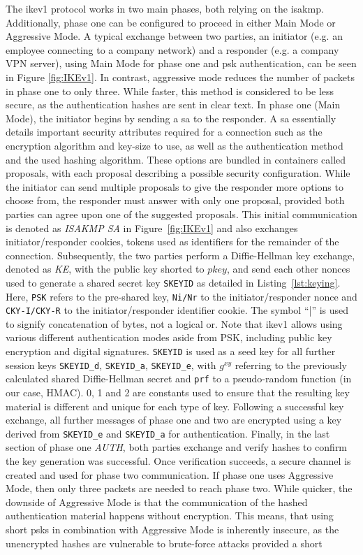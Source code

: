 The \ac{ike}v1 protocol works in two main phases, both relying on the \ac{isakmp}. Additionally, phase one can be configured to proceed in either Main Mode or Aggressive Mode. A typical exchange between two parties, an initiator (e.g. an employee connecting to a company network) and a responder (e.g. a company VPN server), using Main Mode for phase one and \ac{psk} authentication, can be seen in Figure \ref{fig:IKEv1}. In contrast, aggressive mode reduces the number of packets in phase one to only three. While faster, this method is considered to be less secure, as the authentication hashes are sent in clear text. In phase one (Main Mode), the initiator begins by sending a \ac{sa} to the responder. A \ac{sa} essentially details important security attributes required for a connection such as the encryption algorithm and key-size to use, as well as the authentication method and the used hashing algorithm. These options are bundled in containers called proposals, with each proposal describing a possible security configuration. While the initiator can send multiple proposals to give the responder more options to choose from, the responder must answer with only one proposal, provided both parties can agree upon one of the suggested proposals. This initial communication is denoted as \emph{ISAKMP SA} in Figure~\ref{fig:IKEv1} and also exchanges initiator/responder cookies, tokens used as identifiers for the remainder of the connection. Subsequently, the two parties perform a Diffie-Hellman key exchange, denoted as \emph{KE}, with the public key shorted to $pkey$, and send each other nonces used to generate a shared secret key \texttt{SKEYID} as detailed in Listing~\ref{lst:keying}. Here, \texttt{PSK} refers to the pre-shared key, \texttt{Ni/Nr} to the initiator/responder nonce and \texttt{CKY-I/CKY-R} to the initiator/responder identifier cookie. The symbol ``|'' is used to signify concatenation of bytes, not a logical or. Note that \ac{ike}v1 allows using various different authentication modes aside from PSK, including public key encryption and digital signatures. \texttt{SKEYID} is used as a seed key for all further session keys \texttt{SKEYID\_d}, \texttt{SKEYID\_a}, \texttt{SKEYID\_e}, with $g^{xy}$ referring to the previously calculated shared Diffie-Hellman secret and \texttt{prf} to a pseudo-random function (in our case, HMAC). 0, 1 and 2 are constants used to ensure that the resulting key material is different and unique for each type of key. Following a successful key exchange, all further messages of phase one and two are encrypted using a key derived from \texttt{SKEYID\_e} and \texttt{SKEYID\_a} for authentication. Finally, in the last section of phase one \emph{AUTH}, both parties exchange and verify hashes to confirm the key generation was successful. Once verification succeeds, a secure channel is created and used for phase two communication. If phase one uses Aggressive Mode, then only three packets are needed to reach phase two. While quicker, the downside of Aggressive Mode is that the communication of the hashed authentication material happens without encryption. This means, that using short \acp{psk} in combination with Aggressive Mode is inherently insecure, as the unencrypted hashes are vulnerable to brute-force attacks provided a short 